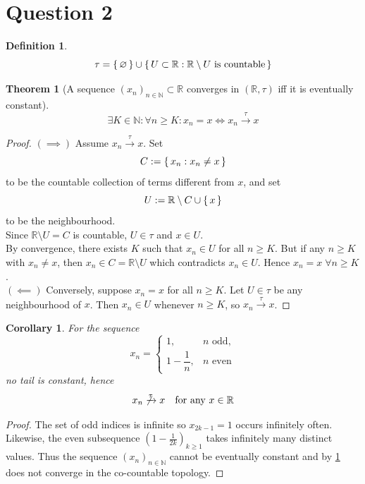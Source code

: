 \documentclass[dvipsnames,12pt]{exam}
\newcommand{\N}{{\mathbb{N}}}
\newcommand{\R}{{\mathbb{R}}}
\newtheorem{theorem}{Theorem}[section]
\newtheorem{corollary}{Corollary}[theorem]
\theoremstyle{definition}
\newtheorem{definition}{Definition}[section]
\begin{document}
\newpage

\section{Question 2} \label{question2}
\begin{definition}
    \[\tau = \set{\varnothing} \cup \set{U\subset \R:\R \setminus U \text{ is countable}}\]
\end{definition}

\begin{theorem}[A sequence $(x_n)_{n\in\N}\subset\R$ converges in $(\R,\tau)$ iff it is eventually constant]\label{thm2}
    \[\exists K\in \N: \forall n \ge K: x_n = x \iff x_n \xrightarrow{\tau} x\]

\end{theorem}
\begin{proof}
    $(\implies)$ Assume $x_n \xrightarrow{\tau}x$. Set \[C := \set{x_n:x_n\neq x}\] to be the countable collection of terms different from $x$, and set \[U:=\R \setminus C \cup \set{x}\] to be the neighbourhood.\\


    Since $\R\setminus U = C$ is countable, $U\in\tau$ and $x\in U$.\\


    By convergence, there exists $K$ such that $x_n\in U$ for all $n\ge K$. But if any $n\ge K$ with $x_n \neq x$, then $x_n \in C = \R\setminus U$ which contradicts $x_n\in U$. Hence $x_n=x \;\forall n \ge K$.\\



    $(\impliedby)$ Conversely, suppose $x_n=x$ for all $n\ge K$. Let $U\in \tau$ be any neighbourhood of $x$. Then $x_n \in U$ whenever $n\ge K$, so $x_n\xrightarrow{\tau} x$.

\end{proof}

\begin{corollary}
    For the sequence \[x_n=\begin{cases}1,& n\text{ odd},\\1-\dfrac1n, & n\text{ even}\end{cases}\] no tail is constant, hence \[x_n \not\xrightarrow{\tau}x\quad\text{for any }x\in\R\]
\end{corollary}
\begin{proof}
    The set of odd indices is infinite so $x_{2k-1} = 1$ occurs infinitely often. Likewise, the even subsequence $(1-\tfrac1{2k})_{k\ge1}$ takes infinitely many distinct values. Thus the sequence $(x_n)_{n\in\N}$ cannot be eventually constant and by \ref{thm2} does not converge in the co-countable topology.
\end{proof}
\end{document}
